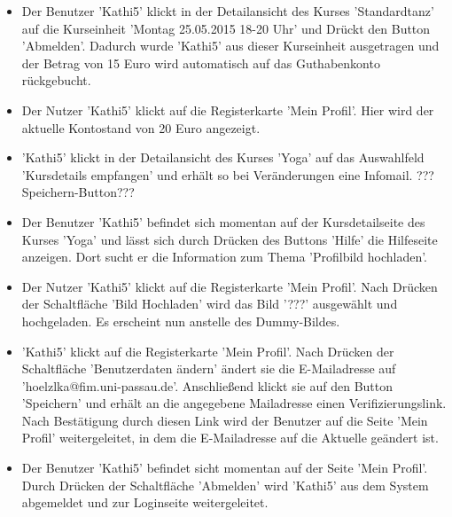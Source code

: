 \documentclass[a4paper]{scrreprt}
\begin{document}
\begin{itemize}
				\item {}
				Der Benutzer 'Kathi5' klickt in der Detailansicht des Kurses 'Standardtanz' auf die Kurseinheit 'Montag 25.05.2015 18-20 Uhr' und Drückt den Button 'Abmelden'. Dadurch wurde 'Kathi5' aus dieser Kurseinheit ausgetragen und der Betrag von 15 Euro wird automatisch auf das Guthabenkonto rückgebucht. 
				
				\item {}
				Der Nutzer 'Kathi5' klickt auf die Registerkarte 'Mein Profil'. Hier wird der aktuelle Kontostand von 20 Euro angezeigt.
				
				\item {}
				'Kathi5' klickt in der Detailansicht des Kurses 'Yoga' auf das Auswahlfeld 'Kursdetails empfangen' und erhält so bei Veränderungen eine Infomail.  ??? Speichern-Button???
				
				\item {}
				Der Benutzer 'Kathi5' befindet sich momentan auf der Kursdetailseite des Kurses 'Yoga' und lässt sich durch Drücken des Buttons 'Hilfe' die Hilfeseite anzeigen. Dort sucht er die Information zum Thema 'Profilbild hochladen'.
					
				\item {}
				Der Nutzer 'Kathi5' klickt auf die Registerkarte 'Mein Profil'. Nach Drücken der Schaltfläche 'Bild Hochladen' wird das Bild '???' ausgewählt und hochgeladen. Es erscheint nun anstelle des Dummy-Bildes.
				
				\item {}
				'Kathi5' klickt auf die Registerkarte 'Mein Profil'. Nach Drücken der Schaltfläche 'Benutzerdaten ändern' ändert sie die E-Mailadresse auf 'hoelzlka@fim.uni-passau.de'. Anschließend klickt sie auf den Button 'Speichern' und erhält an die angegebene Mailadresse einen Verifizierungslink. Nach Bestätigung durch diesen Link wird der Benutzer auf die Seite 'Mein Profil' weitergeleitet, in dem die E-Mailadresse auf die Aktuelle geändert ist.
				
				\item {}
				Der Benutzer 'Kathi5' befindet sicht momentan auf der Seite 'Mein Profil'. Durch Drücken der Schaltfläche 'Abmelden' wird 'Kathi5' aus dem System abgemeldet und zur Loginseite weitergeleitet.	
					
			\end{itemize}
\end{document}
